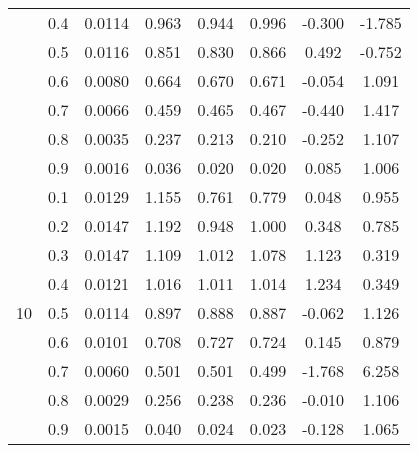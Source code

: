 \documentclass[11pt,a4paper]{report}
\begin{document}
\begin{longtable}{ | c | c || c | c | c | c | c | c | }
 & 0.4 & 0.0114 & 0.963 & 0.944 & 0.996 & -0.300 & -1.785 \\
 & 0.5 & 0.0116 & 0.851 & 0.830 & 0.866 & 0.492 & -0.752 \\
 & 0.6 & 0.0080 & 0.664 & 0.670 & 0.671 & -0.054 & 1.091 \\
 & 0.7 & 0.0066 & 0.459 & 0.465 & 0.467 & -0.440 & 1.417 \\
 & 0.8 & 0.0035 & 0.237 & 0.213 & 0.210 & -0.252 & 1.107 \\
 & 0.9 & 0.0016 & 0.036 & 0.020 & 0.020 & 0.085 & 1.006 \\
 \hline
\multirow{9}{*}{10} & 0.1 & 0.0129 & 1.155 & 0.761 & 0.779 & 0.048 & 0.955 \\
 & 0.2 & 0.0147 & 1.192 & 0.948 & 1.000 & 0.348 & 0.785 \\
 & 0.3 & 0.0147 & 1.109 & 1.012 & 1.078 & 1.123 & 0.319 \\
 & 0.4 & 0.0121 & 1.016 & 1.011 & 1.014 & 1.234 & 0.349 \\
 & 0.5 & 0.0114 & 0.897 & 0.888 & 0.887 & -0.062 & 1.126 \\
 & 0.6 & 0.0101 & 0.708 & 0.727 & 0.724 & 0.145 & 0.879 \\
 & 0.7 & 0.0060 & 0.501 & 0.501 & 0.499 & -1.768 & 6.258 \\
 & 0.8 & 0.0029 & 0.256 & 0.238 & 0.236 & -0.010 & 1.106 \\
 & 0.9 & 0.0015 & 0.040 & 0.024 & 0.023 & -0.128 & 1.065 \\
 \hline
\hline
\end{longtable}
\end{document}
